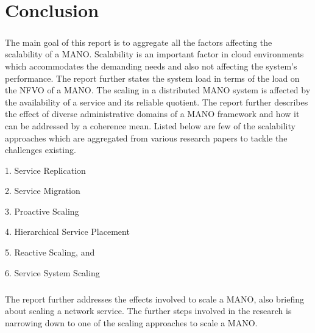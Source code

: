 \chapter{Conclusion}
\label{ch:Conclusion}

\paragraph{}The main goal of this report is to aggregate all the factors affecting the scalability of a MANO. Scalability is an important factor in cloud environments which accommodates the demanding needs and also not affecting the system’s performance. The report further states the system load in terms of the load on the NFVO of a MANO. The scaling in a distributed MANO system is affected by the availability of a service and its reliable quotient. The report further describes the effect of diverse administrative domains of a MANO framework and how it can be addressed by a coherence mean. Listed below are few of the scalability approaches which are aggregated from various research papers to tackle the challenges existing.

1.    Service Replication

2.    Service Migration

3.    Proactive Scaling

4.    Hierarchical Service Placement

5.    Reactive Scaling, and

6. 	  Service System Scaling


\paragraph{} The report further addresses the effects involved to scale a MANO, also briefing about scaling a network service. The further steps involved in the research is narrowing down to one of the scaling approaches to scale a MANO.




